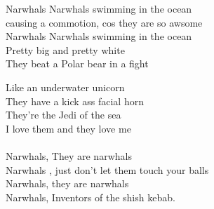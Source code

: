 \vspace{10pt}
Narwhals Narwhals swimming in the ocean\\
causing a commotion, cos they are so awsome\\
Narwhals Narwhals swimming in the ocean\\
Pretty big and pretty white \\
They beat a Polar bear in a fight\par
\vspace{10pt}
Like an underwater unicorn\\
They have a kick ass facial horn\\
They're the Jedi of the sea\\
I love them and they love me\\
\\
Narwhals, They are narwhals\\
Narwhals , just don't let them touch your balls\\
Narwhals, they are narwhals\\
Narwhals, Inventors of the shish kebab.
